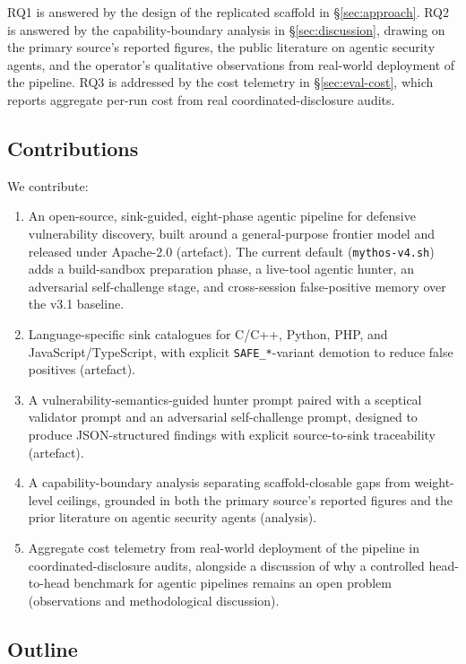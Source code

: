 \documentclass[11pt,a4paper]{article}
\begin{document}
RQ1 is answered by the design of the replicated scaffold in
\S\ref{sec:approach}. RQ2 is answered by the capability-boundary analysis
in \S\ref{sec:discussion}, drawing on the primary source's reported
figures, the public literature on agentic security agents, and the
operator's qualitative observations from real-world deployment of the
pipeline. RQ3 is addressed by the cost telemetry in
\S\ref{sec:eval-cost}, which reports aggregate per-run cost from real
coordinated-disclosure audits.

\subsection{Contributions}
\label{sec:contributions}

We contribute:

\begin{enumerate}[leftmargin=20pt,label=C\arabic*.]
  \item An open-source, sink-guided, eight-phase agentic pipeline for
  defensive vulnerability discovery, built around a general-purpose frontier
  model and released under Apache-2.0 (artefact). The current default
  (\texttt{mythos-v4.sh}) adds a build-sandbox preparation phase, a
  live-tool agentic hunter, an adversarial self-challenge stage, and
  cross-session false-positive memory over the v3.1 baseline.
  \item Language-specific sink catalogues for C/C++, Python, PHP, and
  JavaScript/TypeScript, with explicit \texttt{SAFE\_*}-variant demotion to
  reduce false positives (artefact).
  \item A vulnerability-semantics-guided hunter prompt paired with a
  sceptical validator prompt and an adversarial self-challenge prompt,
  designed to produce JSON-structured findings with explicit
  source-to-sink traceability (artefact).
  \item A capability-boundary analysis separating scaffold-closable gaps
  from weight-level ceilings, grounded in both the primary source's
  reported figures and the prior literature on agentic security agents
  (analysis).
  \item Aggregate cost telemetry from real-world deployment of the
  pipeline in coordinated-disclosure audits, alongside a discussion of
  why a controlled head-to-head benchmark for agentic pipelines remains
  an open problem (observations and methodological discussion).
\end{enumerate}

\subsection{Outline}
\end{document}
